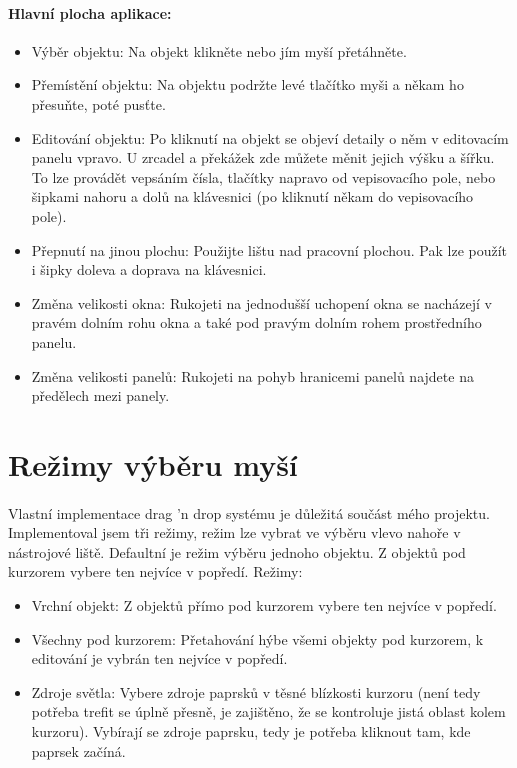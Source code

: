 \documentclass[12pt,a4paper]{report}
\begin{document}
\paragraph{Hlavní plocha aplikace:}

\enlargethispage{1\baselineskip}
\begin{itemize}
    \item Výběr objektu: Na objekt klikněte nebo jím myší přetáhněte.
    \item Přemístění objektu: Na objektu podržte levé tlačítko myši a někam ho přesuňte, poté pusťte.
    \item Editování objektu: Po kliknutí na objekt se objeví detaily o něm v editovacím panelu vpravo. U zrcadel a překážek zde můžete měnit jejich výšku a šířku. To lze provádět vepsáním čísla, tlačítky napravo od vepisovacího pole, nebo šipkami nahoru a dolů na klávesnici (po kliknutí někam do vepisovacího pole).
    \item Přepnutí na jinou plochu: Použijte lištu nad pracovní plochou. Pak lze použít i šipky doleva a doprava na klávesnici.
    \item Změna velikosti okna: Rukojeti na jednodušší uchopení okna se nacházejí v pravém dolním rohu okna a také pod pravým dolním rohem prostředního panelu.
    \item Změna velikosti panelů: Rukojeti na pohyb hranicemi panelů najdete na předělech mezi panely.
\end{itemize}

\section{Režimy výběru myší}
\paragraph{} Vlastní implementace drag 'n drop systému je důležitá součást mého projektu. Implementoval jsem tři režimy, režim lze vybrat ve výběru vlevo nahoře v nástrojové liště. Defaultní je režim výběru jednoho objektu. Z objektů pod kurzorem vybere ten nejvíce v popředí. Režimy:
\begin{itemize}
    \item Vrchní objekt: Z objektů přímo pod kurzorem vybere ten nejvíce v popředí.
    \item Všechny pod kurzorem: Přetahování hýbe všemi objekty pod kurzorem, k editování je vybrán ten nejvíce v popředí.
    \item Zdroje světla: Vybere zdroje paprsků v těsné blízkosti kurzoru (není tedy potřeba trefit se úplně přesně, je zajištěno, že se kontroluje jistá oblast kolem kurzoru). Vybírají se zdroje paprsku, tedy je potřeba kliknout tam, kde paprsek začíná.
\end{itemize}
\end{document}
